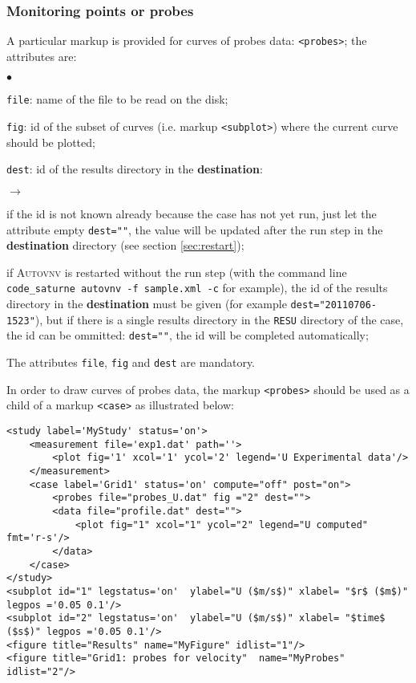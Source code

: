 \documentclass[a4paper,10pt,twoside]{csshortdoc}
\begin{document}
\subsubsection{Monitoring points or probes}

A particular markup is provided for curves of probes data:
\texttt{<probes>}; the attributes are:

\begin{list}{$\bullet$}{}
\item \texttt{file}: name of the file to be read on the disk;
\item \texttt{fig}: id of the subset of curves (i.e. markup \texttt{<subplot>})
where the current curve should be plotted;
\item \texttt{dest}: id of the results directory in the \textbf{destination}:
\begin{list}{$\rightarrow$}{}
\item if the id is not known already because the case has not yet run, just let
the attribute empty \texttt{dest=""}, the value will be updated after the run
step in the \textbf{destination} directory (see section \ref{sec:restart});
\item if \textsc{Autovnv} is restarted without the run step (with the command
line \texttt{code\_saturne autovnv -f sample.xml -c} for example), the id of
the results directory in the \textbf{destination} must be given (for example
\texttt{dest="20110706-1523"}), but if there is a single results directory in
the \texttt{RESU} directory of the case, the id can be ommitted:
\texttt{dest=""}, the id will be completed automatically;
\end{list}
\end{list}

The attributes \texttt{file}, \texttt{fig} and \texttt{dest} are mandatory.

In order to draw curves of probes data, the markup \texttt{<probes>}
should be used as a child of a markup \texttt{<case>} as illustrated below:

\small
\begin{verbatim}
<study label='MyStudy' status='on'>
    <measurement file='exp1.dat' path=''>
        <plot fig='1' xcol='1' ycol='2' legend='U Experimental data'/>
    </measurement>
    <case label='Grid1' status='on' compute="off" post="on">
        <probes file="probes_U.dat" fig ="2" dest="">
        <data file="profile.dat" dest="">
            <plot fig="1" xcol="1" ycol="2" legend="U computed" fmt='r-s'/>
        </data>
    </case>
</study>
<subplot id="1" legstatus='on'  ylabel="U ($m/s$)" xlabel= "$r$ ($m$)" legpos ='0.05 0.1'/>
<subplot id="2" legstatus='on'  ylabel="U ($m/s$)" xlabel= "$time$ ($s$)" legpos ='0.05 0.1'/>
<figure title="Results" name="MyFigure" idlist="1"/>
<figure title="Grid1: probes for velocity"  name="MyProbes" idlist="2"/>
\end{verbatim}
\normalsize
\end{document}
